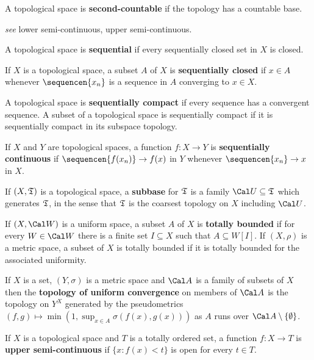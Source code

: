  A topological space is
{\bf second-countable} if the topology has a
countable base.

 {\it see} lower semi-continuous, upper
semi-continuous.

 A topological space is {\bf sequential} if every
sequentially closed set in $X$ is closed.

 If $X$ is a topological space, a subset $A$
of
$X$ is {\bf sequentially closed} if $x\in A$ whenever $\sequencen{x_n}$
is a sequence in $A$ converging to $x\in X$.

 A topological space is
{\bf sequentially compact} if every sequence has a convergent sequence.
A subset of a
topological space is sequentially compact if it is sequentially compact
in its subspace topology.   

 If $X$ and $Y$ are topological spaces,
a function $f:X\to Y$ is {\bf sequentially continuous} if
$\sequencen{f(x_n)}\to f(x)$ in $Y$ whenever $\sequencen{x_n}\to x$ in
$X$.

 If $(X,\frak T)$ is a topological space, a {\bf
subbase}
for $\frak T$ is a family $\Cal U\subseteq\frak T$ which generates
$\frak T$, in the sense that $\frak T$ is the coarsest topology on $X$
including $\Cal U$.   

 If $(X,\Cal W)$ is a uniform space, a subset
$A$ of $X$ is {\bf totally bounded} if for every $W\in\Cal W$ there is a
finite set $I\subseteq X$ such that $A\subseteq W[I]$.   If $(X,\rho)$
is a metric space, a subset of $X$ is totally bounded if it is totally
bounded for the associated uniformity.

 If $X$ is a set, $(Y,\sigma)$ is a metric
space and $\Cal A$ is a family
of subsets of $X$ then the {\bf topology of uniform convergence} on
members of $\Cal A$ is the topology on $Y^X$ generated by the
pseudometrics $(f,g)\mapsto\min(1,\sup_{x\in A}\sigma(f(x),g(x)))$ as
$A$ runs over
$\Cal A\setminus\{\emptyset\}$.   

 If $X$ is a topological space and $T$ is a
totally ordered set, a function
$f:X\to T$ is {\bf upper semi-continuous} if $\{x:f(x)<t\}$ is
open for every $t\in T$.

